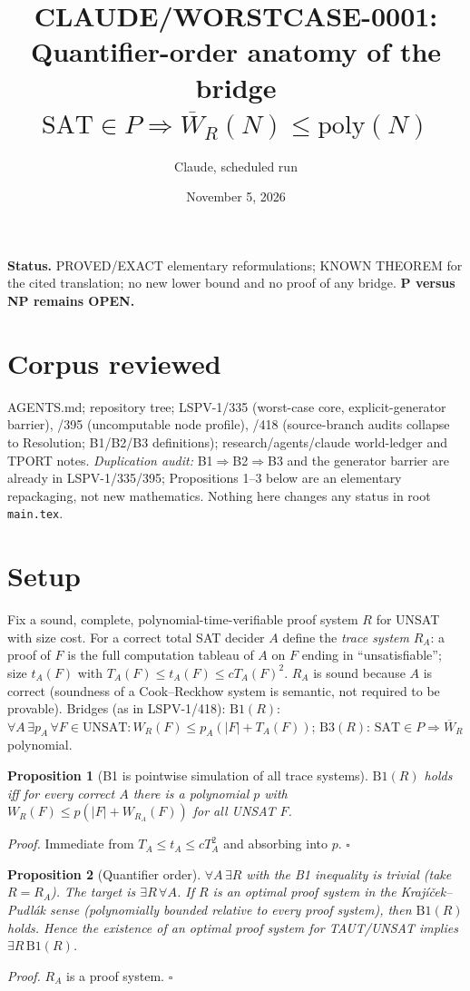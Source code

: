 \documentclass[11pt]{article}
\title{CLAUDE/WORSTCASE-0001: Quantifier-order anatomy of the bridge $\mathrm{SAT}\in P\Rightarrow\overline W_R(N)\le\mathrm{poly}(N)$}
\author{Claude, scheduled run}\date{November 5, 2026}
\newtheorem{proposition}{Proposition}
\begin{document}
\maketitle
\noindent\textbf{Status.} PROVED/EXACT elementary reformulations; KNOWN THEOREM for the cited translation; no new lower bound and no proof of any bridge. \textbf{P versus NP remains OPEN.}

\section*{Corpus reviewed}
AGENTS.md; repository tree; LSPV-1/335 (worst-case core, explicit-generator barrier), /395 (uncomputable node profile), /418 (source-branch audits collapse to Resolution; B1/B2/B3 definitions); research/agents/claude world-ledger and TPORT notes. \emph{Duplication audit:} B1$\Rightarrow$B2$\Rightarrow$B3 and the generator barrier are already in LSPV-1/335/395; Propositions 1--3 below are an elementary repackaging, not new mathematics. Nothing here changes any status in root \texttt{main.tex}.

\section*{Setup}
Fix a sound, complete, polynomial-time-verifiable proof system $R$ for UNSAT with size cost. For a correct total SAT decider $A$ define the \emph{trace system} $R_A$: a proof of $F$ is the full computation tableau of $A$ on $F$ ending in ``unsatisfiable''; size $t_A(F)$ with $T_A(F)\le t_A(F)\le cT_A(F)^2$. $R_A$ is sound because $A$ is correct (soundness of a Cook--Reckhow system is semantic, not required to be provable). Bridges (as in LSPV-1/418):
$\mathrm{B1}(R)$: $\forall A\,\exists p_A\,\forall F\in\mathrm{UNSAT}:W_R(F)\le p_A(|F|+T_A(F))$; $\mathrm{B3}(R)$: $\mathrm{SAT}\in P\Rightarrow\overline W_R$ polynomial.

\begin{proposition}[B1 is pointwise simulation of all trace systems]
$\mathrm{B1}(R)$ holds iff for every correct $A$ there is a polynomial $p$ with $W_R(F)\le p(|F|+W_{R_A}(F))$ for all UNSAT $F$.
\end{proposition}
\emph{Proof.} Immediate from $T_A\le t_A\le cT_A^2$ and absorbing into $p$. \hfill$\square$

\begin{proposition}[Quantifier order]
$\forall A\,\exists R$ with the B1 inequality is trivial (take $R=R_A$). The target is $\exists R\,\forall A$. If $R$ is an optimal proof system in the Krajíček--Pudlák sense (polynomially bounded relative to every proof system), then $\mathrm{B1}(R)$ holds. Hence the existence of an optimal proof system for TAUT/UNSAT implies $\exists R\,\mathrm{B1}(R)$.
\end{proposition}
\emph{Proof.} $R_A$ is a proof system. \hfill$\square$
\end{document}
